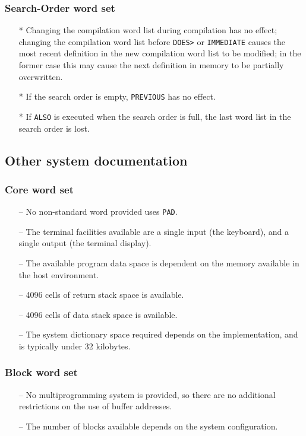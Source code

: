 \documentclass[english]{article}
\begin{document}
\subsubsection{Search-Order word set}
\begin{itemize}
\item[*]Changing the compilation word list during compilation has no effect; changing the compilation word list before {\tt DOES>} or {\tt IMMEDIATE} causes the most recent definition in the new compilation word list to be modified; in the former case this may cause the next definition in memory to be partially overwritten.
\item[*]If the search order is empty, {\tt PREVIOUS} has no effect.
\item[*]If {\tt ALSO} is executed when the search order is full, the last word list in the search order is lost.
\end{itemize}


\subsection{Other system documentation}

\subsubsection{Core word set}

\begin{itemize}
\item[--]No non-standard word provided uses {\tt PAD}.
\item[--]The terminal facilities available are a single input (the keyboard), and a single output (the terminal display).
\item[--]The available program data space is dependent on the memory available in the host environment.
\item[--]4096 cells of return stack space is available.
\item[--]4096 cells of data stack space is available.
\item[--]The system dictionary space required depends on the implementation, and is typically under 32 kilobytes.
\end{itemize}

\subsubsection{Block word set}

\begin{itemize}
\item[--]No multiprogramming system is provided, so there are no additional restrictions on the use of buffer addresses.
\item[--]The number of blocks available depends on the system configuration.
\end{itemize}
\end{document}
